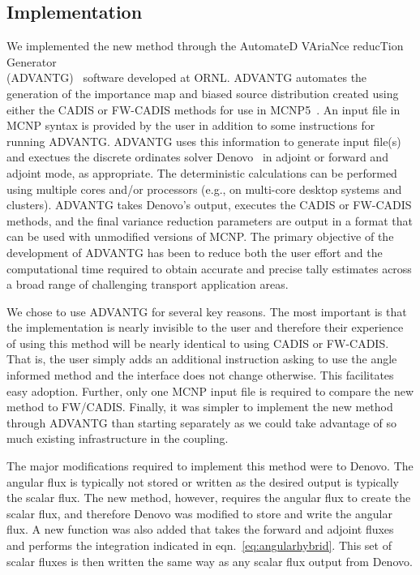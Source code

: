 \documentclass[12pt]{article}
\begin{document}
%

\subsection{Implementation}
\label{subsect::implementation}

We implemented the new method through the AutomateD VAriaNce reducTion Generator\\ (ADVANTG)~\cite{wagner_automated_2002, mosher_new_2010} software developed at ORNL. 
ADVANTG automates the generation of the importance map and biased source distribution created using either the CADIS or FW-CADIS methods for use in MCNP5~\cite{brown_mcnp_2002}. 
An input file in MCNP syntax is provided by the user in addition to some instructions for running ADVANTG. 
ADVANTG uses this information to generate input file(s) and exectues the discrete ordinates solver Denovo~\cite{evans_denovo:_2010} in adjoint or forward and adjoint mode, as appropriate.
The deterministic calculations can be performed using multiple cores and/or processors (e.g., on multi-core desktop systems and clusters). 
ADVANTG takes Denovo's output, executes the CADIS or FW-CADIS methods, and the final variance reduction parameters are output in a format that can be used with unmodified versions of MCNP. 
The primary objective of the development of ADVANTG has been to reduce both the user effort and the computational time required to obtain accurate and precise tally estimates
across a broad range of challenging transport application areas.

We chose to use ADVANTG for several key reasons. 
The most important is that the implementation is nearly invisible to the user and therefore their experience of using this method will be nearly identical to using CADIS or FW-CADIS.
That is, the user simply adds an additional instruction asking to use the angle informed method and the interface does not change otherwise.
This facilitates easy adoption.
Further, only one MCNP input file is required to compare the new method to FW/CADIS.
Finally, it was simpler to implement the new method through ADVANTG than starting separately as we could take advantage of so much existing infrastructure in the coupling.

The major modifications required to implement this method were to Denovo. 
The angular flux is typically not stored or written as the desired output is typically the scalar flux.
The new method, however, requires the angular flux to create the scalar flux, and therefore Denovo was modified to store and write the angular flux.
A new function was also added that takes the forward and adjoint fluxes and performs the integration indicated in eqn.~\eqref{eq:angularhybrid}. 
This set of scalar fluxes is then written the same way as any scalar flux output from Denovo.
\end{document}
